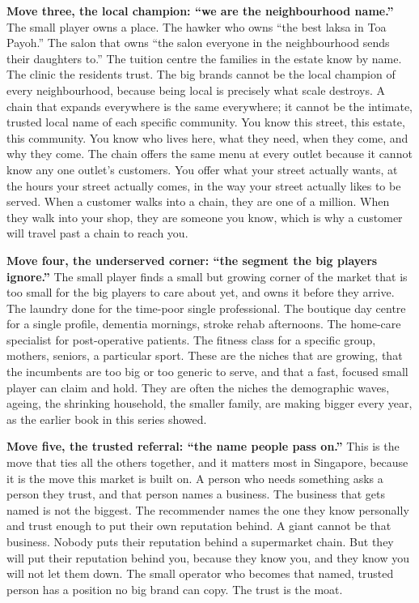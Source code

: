 \documentclass[10pt,twoside,openany]{memoir}
\begin{document}
{\textbf{Move three, the local champion: ``we are the neighbourhood
name.''} The small player owns a place. The hawker who owns ``the best
laksa in Toa Payoh.'' The salon that owns ``the salon everyone in the
neighbourhood sends their daughters to.'' The tuition centre the
families in the estate know by name. The clinic the residents trust. The
big brands cannot be the local champion of every neighbourhood, because
being local is precisely what scale destroys. A chain that expands
everywhere is the same everywhere; it cannot be the intimate, trusted
local name of each specific community. You know this street, this
estate, this community. You know who lives here, what they need, when
they come, and why they come. The chain offers the same menu at every
outlet because it cannot know any one outlet's customers. You offer what
your street actually wants, at the hours your street actually comes, in
the way your street actually likes to be served. When a customer walks
into a chain, they are one of a million. When they walk into your shop,
they are someone you know, which is why a customer will travel past a
chain to reach you.

\textbf{Move four, the underserved corner: ``the segment the big players
ignore.''} The small player finds a small but growing corner of the
market that is too small for the big players to care about yet, and owns
it before they arrive. The laundry done for the time-poor single
professional. The boutique day centre for a single profile, dementia
mornings, stroke rehab afternoons. The home-care specialist for
post-operative patients. The fitness class for a specific group,
mothers, seniors, a particular sport. These are the niches that are
growing, that the incumbents are too big or too generic to serve, and
that a fast, focused small player can claim and hold. They are often the
niches the demographic waves, ageing, the shrinking household, the
smaller family, are making bigger every year, as the earlier book in
this series showed.

\textbf{Move five, the trusted referral: ``the name people pass on.''}
This is the move that ties all the others together, and it matters most
in Singapore, because it is the move this market is built on. A person
who needs something asks a person they trust, and that person names a
business. The business that gets named is not the biggest. The
recommender names the one they know personally and trust enough to put
their own reputation behind. A giant cannot be that business. Nobody
puts their reputation behind a supermarket chain. But they will put
their reputation behind you, because they know you, and they know you
will not let them down. The small operator who becomes that named,
trusted person has a position no big brand can copy. The trust is the
moat.

}
\end{document}
